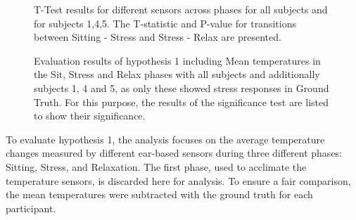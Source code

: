 \begin{figure}[ht]
    \begin{subtable}{\textwidth}
        \centering
        \caption{T-Test results for different sensors across phases for all subjects and for subjects 1,4,5. The T-statistic and P-value for transitions between Sitting - Stress and Stress - Relax are presented.}
        \label{subsec:Evaluation:Study2:Hypothesis1:TTest_Results}
    \end{subtable}
    \caption{Evaluation results of hypothesis 1 including Mean temperatures in the Sit, Stress and Relax phases with all subjects and additionally subjects 1, 4 and 5, as only these showed stress responses in Ground Truth. For this purpose, the results of the significance test are listed to show their significance.}
    \label{sec:Evaluation:Study2:Hypothesis1:Summary}
\end{figure}

To evaluate hypothesis 1, the analysis focuses on the average temperature changes measured by different ear-based sensors during three different phases: Sitting, Stress, and Relaxation. 
The first phase, used to acclimate the temperature sensors, is discarded here for analysis.
To ensure a fair comparison, the mean temperatures were subtracted with the ground truth for each participant.

